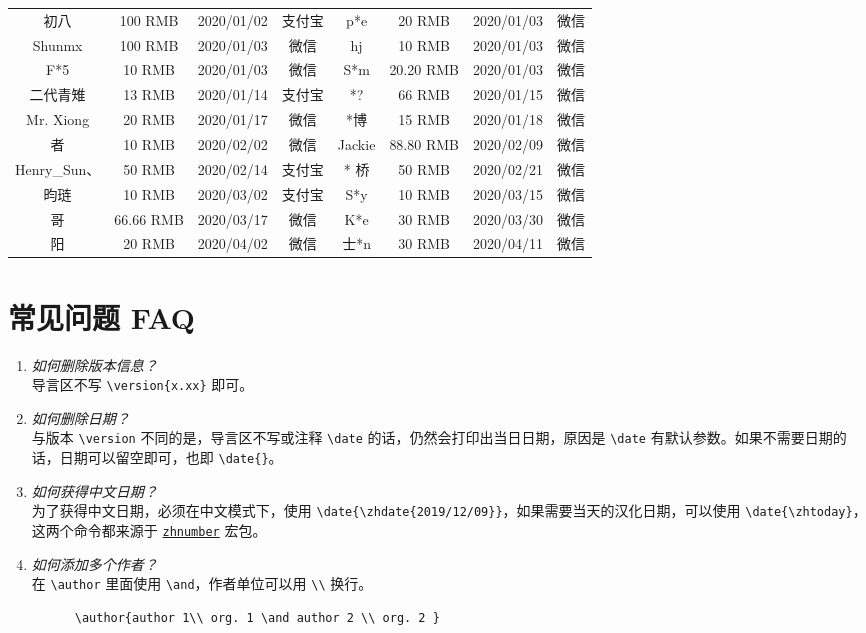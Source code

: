 \documentclass[cn,hazy,blue,14pt,screen]{elegantnote}
\begin{document}
\begin{table}[htbp]
\begin{tabular}{*{8}{>{\scriptsize}c}}
    初八    & 100 RMB  & 2020/01/02 & 支付宝   & p*e   & 20 RMB & 2020/01/03 & 微信 \\
    Shunmx & 100 RMB & 2020/01/03 & 微信    & hj    & 10 RMB & 2020/01/03 & 微信 \\
    F*5   & 10 RMB & 2020/01/03 & 微信    & S*m   & 20.20 RMB & 2020/01/03 & 微信 \\
    二代青雉  & 13 RMB & 2020/01/14 & 支付宝   & *?    & 66 RMB & 2020/01/15 & 微信 \\
    Mr. Xiong & 20 RMB & 2020/01/17 & 微信    & *博    & 15 RMB & 2020/01/18 & 微信 \\
    * 者  & 10 RMB & 2020/02/02 & 微信    & Jackie  &  88.80 RMB  &  2020/02/09 & 微信 \\
    Henry\_Sun、 & 50 RMB & 2020/02/14 & 支付宝 & * 桥  & 50 RMB & 2020/02/21 & 微信 \\
    昀琏 & 10 RMB & 2020/03/02 & 支付宝 & S*y  &  10 RMB  &  2020/03/15 & 微信 \\
    * 哥  & 66.66 RMB & 2020/03/17 & 微信    &   K*e & 30 RMB & 2020/03/30 & 微信\\
    * 阳  &  20 RMB  &  2020/04/02 & 微信 & 士*n  & 30 RMB & 2020/04/11 & 微信 \\
    \bottomrule
    \end{tabular}%
  \label{tab:donation}%
\end{table}%


\section{常见问题 FAQ}

\begin{enumerate}[label=\arabic*).]
  \item \textit{如何删除版本信息？}\\
    导言区不写 \lstinline|\version{x.xx}| 即可。
  \item \textit{如何删除日期？}\\
    与版本 \lstinline{\version} 不同的是，导言区不写或注释 \lstinline{\date} 的话，仍然会打印出当日日期，原因是 \lstinline{\date} 有默认参数。如果不需要日期的话，日期可以留空即可，也即 \lstinline|\date{}|。
  \item \textit{如何获得中文日期？}\\
    为了获得中文日期，必须在中文模式下，使用 \lstinline|\date{\zhdate{2019/12/09}}|，如果需要当天的汉化日期，可以使用 \lstinline|\date{\zhtoday}|，这两个命令都来源于 \href{https://ctan.org/pkg/zhnumber}{\lstinline{zhnumber}} 宏包。
  \item \textit{如何添加多个作者？}\\
    在 \lstinline{\author} 里面使用 \lstinline{\and}，作者单位可以用 \lstinline{\\} 换行。
    \begin{lstlisting}
      \author{author 1\\ org. 1 \and author 2 \\ org. 2 }
    \end{lstlisting}
\end{enumerate}
\end{document}
